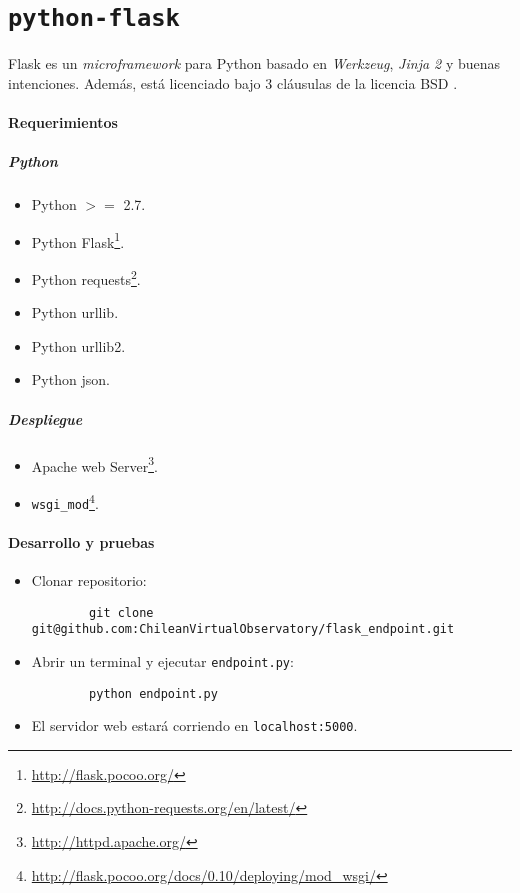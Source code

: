 \section{\texttt{python-flask}}\label{anx:flask}

Flask es un \emph{microframework} para Python basado en \emph{Werkzeug}, \emph{Jinja 2} y buenas intenciones. Además, está licenciado bajo 3 cláusulas de la licencia BSD \cite{flask}.

\paragraph{Requerimientos}

\subparagraph{Python}

\begin{itemize}
	\item Python $>=$ 2.7.
	\item Python Flask\footnote{\url{http://flask.pocoo.org/}}.
	\item Python requests\footnote{\url{http://docs.python-requests.org/en/latest/}}.
	\item Python urllib.
	\item Python urllib2.
	\item Python json.
\end{itemize}

\subparagraph{Despliegue}

\begin{itemize}
	\item Apache web Server\footnote{\url{http://httpd.apache.org/}}.
	\item \verb;wsgi_mod;\footnote{\url{http://flask.pocoo.org/docs/0.10/deploying/mod\_wsgi/}}.
\end{itemize}

\paragraph{Desarrollo y pruebas}

\begin{itemize}
	\item Clonar repositorio:
		\begin{verbatim}
		git clone git@github.com:ChileanVirtualObservatory/flask_endpoint.git
	\end{verbatim}
	\item Abrir un terminal y ejecutar \verb;endpoint.py;:
		\begin{verbatim}
		python endpoint.py
	\end{verbatim}
	\item El servidor web estará corriendo en \verb;localhost:5000;.
\end{itemize}

